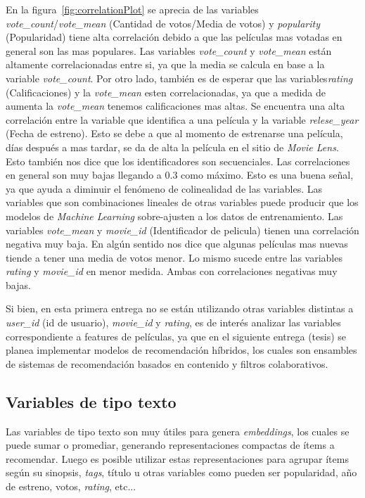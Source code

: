 \documentclass[11pt,a4paper,twoside]{thesis}
\begin{document}
En la figura~\ref{fig:correlationPlot} se aprecia de las variables
\textit{vote\_count}/\textit{vote\_mean} (Cantidad de votos/Media de votos) y
\textit{popularity} (Popularidad) tiene alta correlación debido a que las
películas mas votadas en general son las mas populares. Las variables
\textit{vote\_count} y \textit{vote\_mean} están altamente correlacionadas
entre si, ya que la media se calcula en base a la variable
\textit{vote\_count}. Por otro lado, también es de esperar que las
variables\textit{rating} (Calificaciones) y la \textit{vote\_mean} esten
correlacionadas, ya que a medida de aumenta la \textit{vote\_mean} tenemos
calificaciones mas altas. Se encuentra una alta correlación entre la variable
que identifica a una película y la variable \textit{relese\_year} (Fecha de
estreno). Esto se debe a que al momento de estrenarse una película, días
después a mas tardar, se da de alta la película en el sitio de \textit{Movie
	Lens}. Esto también nos dice que los identificadores son secuenciales. Las
correlaciones en general son muy bajas llegando a $0.3$ como máximo. Esto es
una buena señal, ya que ayuda a diminuir el fenómeno de colinealidad de las
variables. Las variables que son combinaciones lineales de otras variables
puede producir que los modelos de \textit{Machine Learning} sobre-ajusten a los
datos de entrenamiento. Las variables \textit{vote\_mean} y \textit{movie\_id}
(Identificador de pelicula) tienen una correlación negativa muy baja. En algún
sentido nos dice que algunas películas mas nuevas tiende a tener una media de
votos menor. Lo mismo sucede entre las variables \textit{rating} y
\textit{movie\_id} en menor medida. Ambas con correlaciones negativas muy
bajas.

Si bien, en esta primera entrega no se están utilizando otras variables
distintas a \textit{user\_id} (id de usuario), \textit{movie\_id} y
\textit{rating}, es de interés analizar las variables correspondiente a
features de películas, ya que en el siguiente entrega (tesis) se planea
implementar modelos de recomendación híbridos, los cuales son ensambles de
sistemas de recomendación basados en contenido y filtros colaborativos.

\subsection{Variables de tipo texto}

Las variables de tipo texto son muy útiles para genera \textit{embeddings}, los
cuales se puede sumar o promediar, generando representaciones compactas de
ítems a recomendar. Luego es posible utilizar estas representaciones para
agrupar ítems según su sinopsis, \textit{tags}, título u otras variables como
pueden ser popularidad, año de estreno, votos, \textit{rating}, etc...
\end{document}
